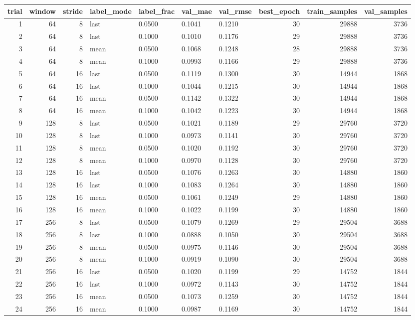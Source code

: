 \begin{tabular}{rrrllllrrr}
\toprule
trial & window & stride & label_mode & label_frac & val_mae & val_rmse & best_epoch & train_samples & val_samples \\
\midrule
1 & 64 & 8 & last & 0.0500 & 0.1041 & 0.1210 & 30 & 29888 & 3736 \\
2 & 64 & 8 & last & 0.1000 & 0.1010 & 0.1176 & 29 & 29888 & 3736 \\
3 & 64 & 8 & mean & 0.0500 & 0.1068 & 0.1248 & 28 & 29888 & 3736 \\
4 & 64 & 8 & mean & 0.1000 & 0.0993 & 0.1166 & 29 & 29888 & 3736 \\
5 & 64 & 16 & last & 0.0500 & 0.1119 & 0.1300 & 30 & 14944 & 1868 \\
6 & 64 & 16 & last & 0.1000 & 0.1044 & 0.1215 & 30 & 14944 & 1868 \\
7 & 64 & 16 & mean & 0.0500 & 0.1142 & 0.1322 & 30 & 14944 & 1868 \\
8 & 64 & 16 & mean & 0.1000 & 0.1042 & 0.1223 & 30 & 14944 & 1868 \\
9 & 128 & 8 & last & 0.0500 & 0.1021 & 0.1189 & 29 & 29760 & 3720 \\
10 & 128 & 8 & last & 0.1000 & 0.0973 & 0.1141 & 30 & 29760 & 3720 \\
11 & 128 & 8 & mean & 0.0500 & 0.1020 & 0.1192 & 30 & 29760 & 3720 \\
12 & 128 & 8 & mean & 0.1000 & 0.0970 & 0.1128 & 30 & 29760 & 3720 \\
13 & 128 & 16 & last & 0.0500 & 0.1076 & 0.1263 & 30 & 14880 & 1860 \\
14 & 128 & 16 & last & 0.1000 & 0.1083 & 0.1264 & 30 & 14880 & 1860 \\
15 & 128 & 16 & mean & 0.0500 & 0.1061 & 0.1249 & 29 & 14880 & 1860 \\
16 & 128 & 16 & mean & 0.1000 & 0.1022 & 0.1199 & 30 & 14880 & 1860 \\
17 & 256 & 8 & last & 0.0500 & 0.1079 & 0.1269 & 29 & 29504 & 3688 \\
18 & 256 & 8 & last & 0.1000 & 0.0888 & 0.1050 & 30 & 29504 & 3688 \\
19 & 256 & 8 & mean & 0.0500 & 0.0975 & 0.1146 & 30 & 29504 & 3688 \\
20 & 256 & 8 & mean & 0.1000 & 0.0919 & 0.1090 & 30 & 29504 & 3688 \\
21 & 256 & 16 & last & 0.0500 & 0.1020 & 0.1199 & 29 & 14752 & 1844 \\
22 & 256 & 16 & last & 0.1000 & 0.0972 & 0.1143 & 30 & 14752 & 1844 \\
23 & 256 & 16 & mean & 0.0500 & 0.1073 & 0.1259 & 30 & 14752 & 1844 \\
24 & 256 & 16 & mean & 0.1000 & 0.0987 & 0.1169 & 30 & 14752 & 1844 \\
\bottomrule
\end{tabular}
